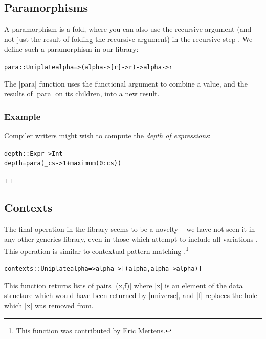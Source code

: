 \documentclass[preprint]{sigplanconf}
\let\cite=\citep
\newcounter{exmp}
\newcommand{\yesexample}{\refstepcounter{exmp}\subsubsection*{Example \arabic{exmp}}}
\newcommand{\noexample}{\hfill$\Box$}
\newenvironment{code}{\begin{alltt}\small}{\end{alltt}}
\newenvironment{example}{\yesexample}{\noexample}
\newcommand{\codeexample}{\vspace{-9mm}\par}
\begin{document}
\subsection{Paramorphisms}

A paramorphism is a fold, where you can also use the recursive argument (and not just the result of folding the recursive argument) in the recursive step \cite{meertens:paramorphisms}. We define such a paramorphism in our library:

\begin{code}
para :: Uniplate alpha => (alpha -> [r] -> r) -> alpha -> r
\end{code}

The |para| function uses the functional argument to combine a value, and the results of |para| on its children, into a new result.

\begin{example}
Compiler writers might wish to compute the \textit{depth of expressions}:

\begin{code}
depth :: Expr -> Int
depth = para (\_ cs -> 1 + maximum (0:cs))
\end{code}\codeexample
\end{example}

\subsection{Contexts}

The final operation in the library seems to be a novelty -- we have not seen it in any other generics library, even in those which attempt to include all variations \citep{ren:generic_recursion_toolbox}. This operation is similar to contextual pattern matching \citep{mohnen:context_patterns}.\footnote{This function was contributed by Eric Mertens.}

\begin{code}
contexts :: Uniplate alpha => alpha -> [(alpha, alpha -> alpha)]
\end{code}

This function returns lists of pairs |(x,f)| where |x| is an element of the data structure which would have been returned by |universe|, and |f| replaces the hole which |x| was removed from.
\end{document}
